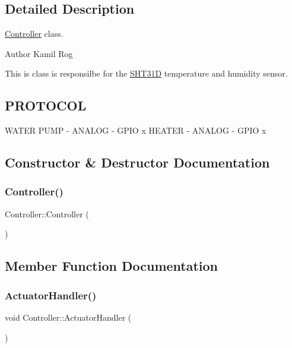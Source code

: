 \subsection{Detailed Description}
\hyperlink{classController}{Controller} class. 

\begin{DoxyAuthor}{Author}
Kamil Rog
\end{DoxyAuthor}
This is class is responsilbe for the \hyperlink{classSHT31D}{S\+H\+T31D} temperature and humidity sensor.\hypertarget{classController_PROTOCOL}{}\subsection{P\+R\+O\+T\+O\+C\+OL}\label{classController_PROTOCOL}
W\+A\+T\+ER P\+U\+MP -\/ A\+N\+A\+L\+OG -\/ G\+P\+IO x H\+E\+A\+T\+ER -\/ A\+N\+A\+L\+OG -\/ G\+P\+IO x 

\subsection{Constructor \& Destructor Documentation}
\mbox{\label{classController_a95c56822d667e94b031451729ce069a9}} 
\subsubsection{\texorpdfstring{Controller()}{Controller()}}
{\footnotesize\ttfamily Controller\+::\+Controller (\begin{DoxyParamCaption}{ }\end{DoxyParamCaption})\hspace{0.3cm}{\ttfamily [inline]}}



\subsection{Member Function Documentation}
\mbox{\label{classController_acd0145853d19eaf3ef9d15f6203ace69}} 
\subsubsection{\texorpdfstring{Actuator\+Handler()}{ActuatorHandler()}}
{\footnotesize\ttfamily void Controller\+::\+Actuator\+Handler (\begin{DoxyParamCaption}{ }\end{DoxyParamCaption})\hspace{0.3cm}{\ttfamily [private]}}

